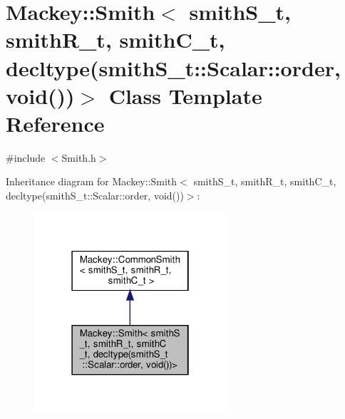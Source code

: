 \hypertarget{classMackey_1_1Smith_3_01smithS__t_00_01smithR__t_00_01smithC__t_00_01decltype_07smithS__t_1_1Scf0454e895315bf0e7b9625b582000795}{}\section{Mackey\+:\+:Smith$<$ smith\+S\+\_\+t, smith\+R\+\_\+t, smith\+C\+\_\+t, decltype(smith\+S\+\_\+t\+:\+:Scalar\+:\+:order, void())$>$ Class Template Reference}
\label{classMackey_1_1Smith_3_01smithS__t_00_01smithR__t_00_01smithC__t_00_01decltype_07smithS__t_1_1Scf0454e895315bf0e7b9625b582000795}


{\ttfamily \#include $<$Smith.\+h$>$}



Inheritance diagram for Mackey\+:\+:Smith$<$ smith\+S\+\_\+t, smith\+R\+\_\+t, smith\+C\+\_\+t, decltype(smith\+S\+\_\+t\+:\+:Scalar\+:\+:order, void())$>$\+:\nopagebreak
\begin{figure}[H]
\begin{center}
\leavevmode
\includegraphics[width=202pt]{classMackey_1_1Smith_3_01smithS__t_00_01smithR__t_00_01smithC__t_00_01decltype_07smithS__t_1_1Sc573b774ac6c6df112445bba1b1c3d0c6}
\end{center}
\end{figure}


